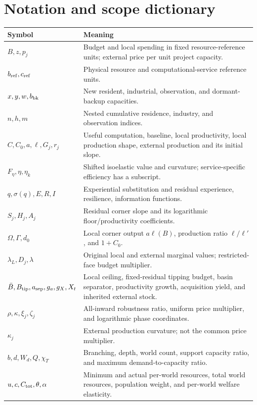 \section{Notation and scope dictionary}
\label{app:notation}
\small
\begin{longtable}{@{}p{}p{}@{}}
\toprule Symbol & Meaning\\\midrule\endhead
$B,z,p_j$ & Budget and local spending in fixed resource-reference units; external price per unit project capacity.\\
$b_{\rm ref},c_{\rm ref}$ & Physical resource and computational-service reference units.\\
$x,y,w,b_{\rm bk}$ & New resident, industrial, observation, and dormant-backup capacities.\\
$n,h,m$ & Nested cumulative residence, industry, and observation indices.\\
$C,C_0,a,\ell,G_j,r_j$ & Useful computation, baseline, local productivity, local production shape, external production and its initial slope.\\
$F_\eta,\eta,\eta_k$ & Shifted isoelastic value and curvature; service-specific efficiency has a subscript.\\
$q,\sigma(q),E,R,I$ & Experiential substitution and residual experience, resilience, information functions.\\
$S_j,H_j,A_j$ & Residual corner slope and its logarithmic floor/productivity coefficients.\\
$\Omega,\Gamma,d_0$ & Local corner output $a\ell(B)$, production ratio $\ell/\ell'$, and $1+C_0$.\\
$\lambda_L,D_j,\lambda$ & Original local and external marginal values; restricted-face budget multiplier.\\
$\bar B,B_{\rm tip},a_{\rm sep},g_a,g_X,X_t$ & Local ceiling, fixed-residual tipping budget, basin separator, productivity growth, acquisition yield, and inherited external stock.\\
$\rho,\kappa,\xi_j,\zeta_j$ & All-inward robustness ratio, uniform price multiplier, and logarithmic phase coordinates.\\
$\kappa_j$ & External production curvature; not the common price multiplier.\\
$b,d,W_d,Q,\chi_T$ & Branching, depth, world count, support capacity ratio, and maximum demand-to-capacity ratio.\\
$u,c,C_{\rm tot},\theta,\alpha$ & Minimum and actual per-world resources, total world resources, population weight, and per-world welfare elasticity.\\

\end{longtable}
